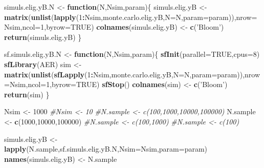 \documentclass[]{book}
\newenvironment{Shaded}{\begin{snugshade}}{\end{snugshade}}
\newcommand{\KeywordTok}[1]{\textcolor[rgb]{0.13,0.29,0.53}{\textbf{#1}}}
\newcommand{\DataTypeTok}[1]{\textcolor[rgb]{0.13,0.29,0.53}{#1}}
\newcommand{\DecValTok}[1]{\textcolor[rgb]{0.00,0.00,0.81}{#1}}
\newcommand{\StringTok}[1]{\textcolor[rgb]{0.31,0.60,0.02}{#1}}
\newcommand{\CommentTok}[1]{\textcolor[rgb]{0.56,0.35,0.01}{\textit{#1}}}
\newcommand{\OtherTok}[1]{\textcolor[rgb]{0.56,0.35,0.01}{#1}}
\newcommand{\ControlFlowTok}[1]{\textcolor[rgb]{0.13,0.29,0.53}{\textbf{#1}}}
\newcommand{\OperatorTok}[1]{\textcolor[rgb]{0.81,0.36,0.00}{\textbf{#1}}}
\newcommand{\NormalTok}[1]{#1}
\theoremstyle{definition}
\theoremstyle{definition}
\theoremstyle{definition}
\theoremstyle{remark}
\begin{document}
\begin{Shaded}
\begin{Highlighting}[]
\NormalTok{simuls.elig.yB.N <-}\StringTok{ }\ControlFlowTok{function}\NormalTok{(N,Nsim,param)\{}
\NormalTok{  simuls.elig.yB <-}\StringTok{ }\KeywordTok{matrix}\NormalTok{(}\KeywordTok{unlist}\NormalTok{(}\KeywordTok{lapply}\NormalTok{(}\DecValTok{1}\OperatorTok{:}\NormalTok{Nsim,monte.carlo.elig.yB,}\DataTypeTok{N=}\NormalTok{N,}\DataTypeTok{param=}\NormalTok{param)),}\DataTypeTok{nrow=}\NormalTok{Nsim,}\DataTypeTok{ncol=}\DecValTok{1}\NormalTok{,}\DataTypeTok{byrow=}\OtherTok{TRUE}\NormalTok{)}
  \KeywordTok{colnames}\NormalTok{(simuls.elig.yB) <-}\StringTok{ }\KeywordTok{c}\NormalTok{(}\StringTok{'Bloom'}\NormalTok{)}
  \KeywordTok{return}\NormalTok{(simuls.elig.yB)}
\NormalTok{\}}

\NormalTok{sf.simuls.elig.yB.N <-}\StringTok{ }\ControlFlowTok{function}\NormalTok{(N,Nsim,param)\{}
  \KeywordTok{sfInit}\NormalTok{(}\DataTypeTok{parallel=}\OtherTok{TRUE}\NormalTok{,}\DataTypeTok{cpus=}\DecValTok{8}\NormalTok{)}
  \KeywordTok{sfLibrary}\NormalTok{(AER)}
\NormalTok{  sim <-}\StringTok{ }\KeywordTok{matrix}\NormalTok{(}\KeywordTok{unlist}\NormalTok{(}\KeywordTok{sfLapply}\NormalTok{(}\DecValTok{1}\OperatorTok{:}\NormalTok{Nsim,monte.carlo.elig.yB,}\DataTypeTok{N=}\NormalTok{N,}\DataTypeTok{param=}\NormalTok{param)),}\DataTypeTok{nrow=}\NormalTok{Nsim,}\DataTypeTok{ncol=}\DecValTok{1}\NormalTok{,}\DataTypeTok{byrow=}\OtherTok{TRUE}\NormalTok{)}
  \KeywordTok{sfStop}\NormalTok{()}
  \KeywordTok{colnames}\NormalTok{(sim) <-}\StringTok{ }\KeywordTok{c}\NormalTok{(}\StringTok{'Bloom'}\NormalTok{)}
  \KeywordTok{return}\NormalTok{(sim)}
\NormalTok{\}}

\NormalTok{Nsim <-}\StringTok{ }\DecValTok{1000}
\CommentTok{#Nsim <- 10}
\CommentTok{#N.sample <- c(100,1000,10000,100000)}
\NormalTok{N.sample <-}\StringTok{ }\KeywordTok{c}\NormalTok{(}\DecValTok{1000}\NormalTok{,}\DecValTok{10000}\NormalTok{,}\DecValTok{100000}\NormalTok{)}
\CommentTok{#N.sample <- c(100,1000)}
\CommentTok{#N.sample <- c(100)}

\NormalTok{simuls.elig.yB <-}\StringTok{ }\KeywordTok{lapply}\NormalTok{(N.sample,sf.simuls.elig.yB.N,}\DataTypeTok{Nsim=}\NormalTok{Nsim,}\DataTypeTok{param=}\NormalTok{param)}
\KeywordTok{names}\NormalTok{(simuls.elig.yB) <-}\StringTok{ }\NormalTok{N.sample}
\end{Highlighting}
\end{Shaded}
\end{document}
